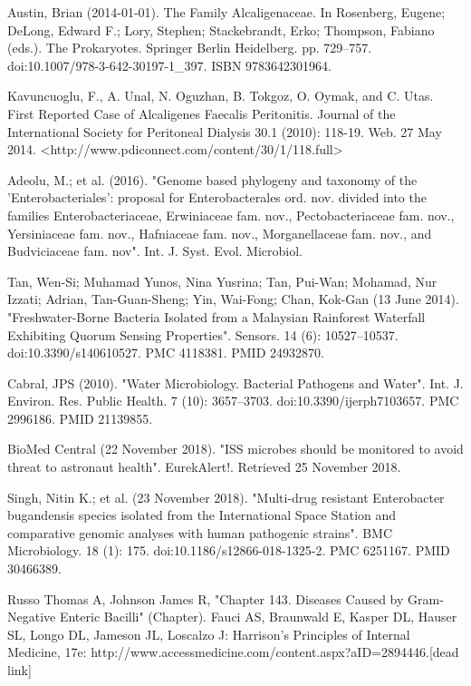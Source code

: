 \documentclass[11pt]{article}
\begin{document}
\begin{thebibliography}{3}
		 Austin, Brian (2014-01-01). The Family Alcaligenaceae. In Rosenberg, Eugene; DeLong, Edward F.; Lory, Stephen; Stackebrandt, Erko; Thompson, Fabiano (eds.). The Prokaryotes. Springer Berlin Heidelberg. pp. 729–757. doi:10.1007/978-3-642-30197-1\_397. ISBN 9783642301964.
		
		 Kavuncuoglu, F., A. Unal, N. Oguzhan, B. Tokgoz, O. Oymak, and C. Utas. First Reported Case of Alcaligenes Faecalis Peritonitis. Journal of the International Society for Peritoneal Dialysis 30.1 (2010): 118-19. Web. 27 May 2014. <http://www.pdiconnect.com/content/30/1/118.full>
		
		 Adeolu, M.; et al. (2016). "Genome based phylogeny and taxonomy of the 'Enterobacteriales': proposal for Enterobacterales ord. nov. divided into the families Enterobacteriaceae, Erwiniaceae fam. nov., Pectobacteriaceae fam. nov., Yersiniaceae fam. nov., Hafniaceae fam. nov., Morganellaceae fam. nov., and Budviciaceae fam. nov". Int. J. Syst. Evol. Microbiol.
		 
		Tan, Wen-Si; Muhamad Yunos, Nina Yusrina; Tan, Pui-Wan; Mohamad, Nur Izzati; Adrian, Tan-Guan-Sheng; Yin, Wai-Fong; Chan, Kok-Gan (13 June 2014). "Freshwater-Borne Bacteria Isolated from a Malaysian Rainforest Waterfall Exhibiting Quorum Sensing Properties". Sensors. 14 (6): 10527–10537. doi:10.3390/s140610527. PMC 4118381. PMID 24932870.
		
		 Cabral, JPS (2010). "Water Microbiology. Bacterial Pathogens and Water". Int. J. Environ. Res. Public Health. 7 (10): 3657–3703. doi:10.3390/ijerph7103657. PMC 2996186. PMID 21139855.
		
		 BioMed Central (22 November 2018). "ISS microbes should be monitored to avoid threat to astronaut health". EurekAlert!. Retrieved 25 November 2018.
		
		 Singh, Nitin K.; et al. (23 November 2018). "Multi-drug resistant Enterobacter bugandensis species isolated from the International Space Station and comparative genomic analyses with human pathogenic strains". BMC Microbiology. 18 (1): 175. doi:10.1186/s12866-018-1325-2. PMC 6251167. PMID 30466389.
		
		 Russo Thomas A, Johnson James R, "Chapter 143. Diseases Caused by Gram-Negative Enteric Bacilli" (Chapter). Fauci AS, Braunwald E, Kasper DL, Hauser SL, Longo DL, Jameson JL, Loscalzo J: Harrison's Principles of Internal Medicine, 17e: http://www.accessmedicine.com/content.aspx?aID=2894446.[dead link]
		

\end{thebibliography}
\end{document}

